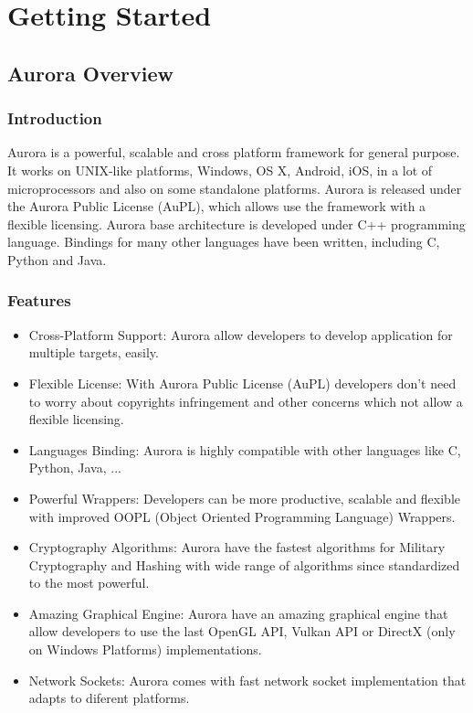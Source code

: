 \part{Getting Started}
\chapter{Aurora Overview}
\section{Introduction}
Aurora is a powerful, scalable and cross platform framework for general purpose. It works on UNIX-like platforms, Windows, OS X, Android, iOS, in a lot of microprocessors and also on some standalone platforms. Aurora is released under the Aurora Public License (AuPL), which allows use the framework with a flexible licensing. Aurora base architecture is developed under C++ programming language. Bindings for many other languages have been written, including C, Python and Java.

\section{Features}
\begin{itemize}
\item Cross-Platform Support: Aurora allow developers to develop application for multiple targets, easily.
\item Flexible License: With Aurora Public License (AuPL) developers don't need to worry about copyrights infringement and other concerns which not allow a flexible licensing.
\item Languages Binding: Aurora is highly compatible with other languages like C, Python, Java, ...
\item Powerful Wrappers: Developers can be more productive, scalable and flexible with improved OOPL (Object Oriented Programming Language) Wrappers.
\item Cryptography Algorithms: Aurora have the fastest algorithms for Military Cryptography and Hashing with wide range of algorithms since standardized to the most powerful.
\item Amazing Graphical Engine: Aurora have an amazing graphical engine that allow developers to use the last OpenGL API, Vulkan API or DirectX (only on Windows Platforms) implementations.
\item Network Sockets: Aurora comes with fast network socket implementation that adapts to diferent platforms.
\end{itemize}

